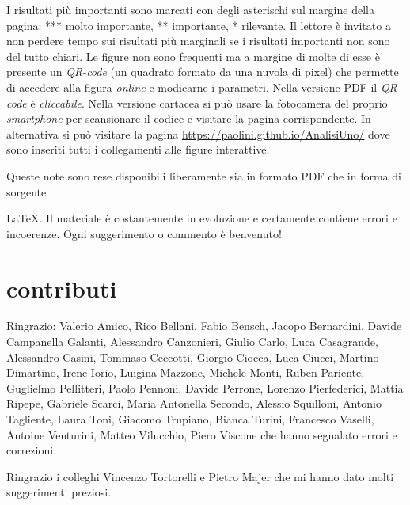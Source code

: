 I risultati più importanti sono marcati con degli asterischi sul margine %
della pagina: *** molto importante, ** importante, * rilevante. %
Il lettore è invitato a non perdere tempo sui risultati più marginali %
se i risultati importanti non sono del tutto chiari. %
Le figure non sono frequenti ma a margine di molte di esse  %
è presente un \emph{QR-code} (un quadrato formato da una nuvola di pixel) %
che permette di accedere alla figura  %
\emph{online} e modicarne i parametri.  %
Nella versione PDF il \emph{QR-code} è \emph{cliccabile}.  %
Nella versione cartacea si può usare la fotocamera del proprio %
\emph{smartphone} per scansionare il codice e visitare la pagina corrispondente. %
In alternativa si può visitare la pagina \url{https://paolini.github.io/AnalisiUno/}
dove sono inseriti tutti i collegamenti alle figure interattive.
\begin{comment}
Di seguito in questa pagina trovate l'elenco %
con i collegamenti alle figure interattive. %
\end{comment}
Queste note sono rese disponibili liberamente sia in formato PDF che %
in forma di sorgente %
\begin{comment}
LaTeX. %
\end{comment}
\LaTeX{}.
Il materiale è costantemente in evoluzione %
e certamente contiene errori e incoerenze. Ogni suggerimento o commento è %
benvenuto! %


\section*{contributi}

Ringrazio:
%
Valerio Amico,
Rico Bellani,
Fabio Bensch,
Jacopo Bernardini,
Davide Campanella Galanti,
Alessandro Canzonieri,
Giulio Carlo,
Luca Casagrande,
Alessandro Casini,
Tommaso Ceccotti,
Giorgio Ciocca,
Luca Ciucci,
Martino Dimartino,
Irene Iorio,
Luigina Mazzone,
Michele Monti,
Ruben Pariente,
Guglielmo Pellitteri,
Paolo Pennoni,
Davide Perrone,
Lorenzo Pierfederici,
Mattia Ripepe,
Gabriele Scarci,
Maria Antonella Secondo,
Alessio Squilloni,
Antonio Tagliente,
Laura Toni,
Giacomo Trupiano,
Bianca Turini,
Francesco Vaselli,
Antoine Venturini,
Matteo Vilucchio,
Piero Viscone
%
che hanno segnalato errori e correzioni.

Ringrazio i colleghi Vincenzo Tortorelli e Pietro Majer
che mi hanno dato molti suggerimenti preziosi.


